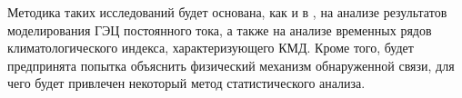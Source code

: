 Методика таких исследований будет основана, как и в \cite{Slyunyaev_et_al_2021a,Slyunyaev_et_al_2021b,Slyunyaev_et_al_2021c}, на анализе результатов моделирования ГЭЦ постоянного тока, а также на анализе временных рядов климатологического индекса, характеризующего КМД. Кроме того, будет предпринята попытка объяснить физический механизм обнаруженной связи, для чего будет привлечен некоторый метод статистического анализа.